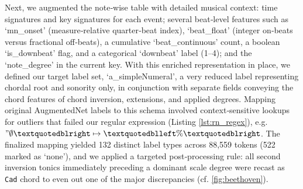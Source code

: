 \documentclass[sigconf]{acmart} %
\begin{document}
Next, we augmented the note‐wise table with detailed musical context: time signatures and key signatures for each event; several beat‐level features such as `mn\_onset' (measure‐relative quarter‐beat index), `beat\_float' (integer on‐beats versus fractional off‐beats), a cumulative `beat\_continuous' count, a boolean `is\_downbeat' flag, and a categorical `downbeat' label (1–4); and the `note\_degree' in the current key.  With this enriched representation in place, we defined our target label set, `a\_simpleNumeral', a very reduced label representing chordal root and sonority only, in conjunction with separate fields conveying the chord features of chord inversion, extensions, and applied degrees.  Mapping original AugmentedNet labels to this schema involved context‐sensitive lookups for outliers that failed our regular expression (Listing \ref{lst:rn_regex}), e.g. $"\emptyset” \mapsto “\%”$.  The finalized mapping yielded 132 distinct label types across 88,559 tokens (522 marked as `none'), and we applied a targeted post‐processing rule: all second inversion tonics immediately preceding a dominant scale degree were recast as \texttt{Cad} chord to even out one of the major discrepancies (cf. \ref{fig:beethoven}).





\end{document}
